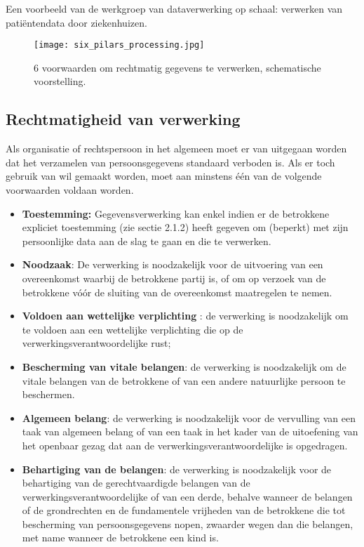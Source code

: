 Een voorbeeld van de werkgroep van dataverwerking op schaal: verwerken van patiëntendata door ziekenhuizen.  

   \begin{figure}[h]
	\centering
	\texttt{[image: six\_pilars\_processing.jpg]}
	\caption{6 voorwaarden om rechtmatig gegevens te verwerken, schematische voorstelling. \textcite{IScoop2017}}
\end{figure}

\subsection{Rechtmatigheid van verwerking}
Als organisatie of rechtspersoon in het algemeen moet er van uitgegaan worden dat het verzamelen van persoonsgegevens standaard verboden is. Als er toch gebruik van wil gemaakt worden, moet aan minstens één van de volgende voorwaarden voldaan worden. \textcite{Commissie2016}
\begin{itemize}
    \item \textbf{Toestemming:} Gegevensverwerking kan enkel indien er de betrokkene expliciet toestemming (zie sectie 2.1.2) heeft gegeven om (beperkt) met zijn persoonlijke data aan de slag te gaan en die te verwerken. \\
    
    \item \textbf{Noodzaak}: De verwerking is noodzakelijk voor de uitvoering van een overeenkomst waarbij de betrokkene partij is, of om op verzoek van de betrokkene vóór de sluiting van de overeenkomst maatregelen te nemen. \\
    
    \item \textbf{Voldoen aan wettelijke verplichting }: de verwerking is noodzakelijk om te voldoen aan een wettelijke verplichting die op de verwerkingsverantwoordelijke rust; \\
    
     \item \textbf{Bescherming van vitale belangen}:  de verwerking is noodzakelijk om de vitale belangen van de betrokkene of van een andere natuurlijke persoon te beschermen. \\
    
    \item \textbf{Algemeen belang}: de verwerking is noodzakelijk voor de vervulling van een taak van algemeen belang of van een taak in het kader van de uitoefening van het openbaar gezag dat aan de verwerkingsverantwoordelijke is opgedragen. \\
    
     \item \textbf{Behartiging van de belangen}: de verwerking is noodzakelijk voor de behartiging van de gerechtvaardigde belangen van de verwerkingsverantwoordelijke of van een derde, behalve wanneer de belangen of de grondrechten en de fundamentele vrijheden van de betrokkene die tot bescherming van persoonsgegevens nopen, zwaarder wegen dan die belangen, met name wanneer de betrokkene een kind is. \\
\end{itemize}



